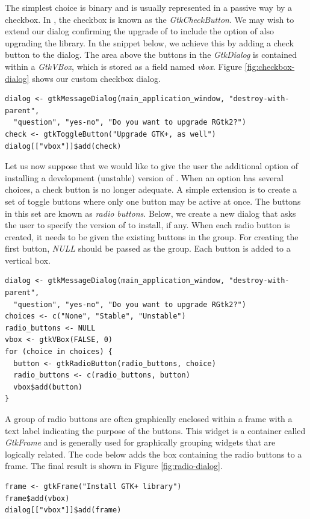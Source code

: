 \documentclass[article]{jss}
\begin{document}
The simplest choice is binary and is usually represented in a passive way 
by a checkbox. In , the checkbox is known as
the \emph{GtkCheckButton}. We may wish to extend our dialog confirming the
upgrade of  to include the option of also upgrading the  
library. In the snippet below, we achieve this by adding a check button to the dialog. 
The area above the buttons in the \emph{GtkDialog} is contained within a 
\emph{GtkVBox}, which is stored as a field named \emph{vbox}. Figure 
\ref{fig:checkbox-dialog} shows our custom checkbox dialog.
\begin{verbatim}
dialog <- gtkMessageDialog(main_application_window, "destroy-with-parent", 
  "question", "yes-no", "Do you want to upgrade RGtk2?")
check <- gtkToggleButton("Upgrade GTK+, as well")
dialog[["vbox"]]$add(check)
\end{verbatim}

Let us now suppose that we would like to give the user the additional option of
installing a development (unstable) version of .
When an option has several choices, a check button is no longer adequate. A
simple extension is to create a set of toggle buttons where only one button
may be active at once. The buttons in this set are known as \emph{radio buttons}.
Below, we create a new dialog that asks the user to specify the version of 
to install, if any. When each radio button is created, it needs to be given the existing buttons
in the group. For creating the first button, \emph{NULL} should be passed as the group.
Each button is added to a vertical box. 
\begin{verbatim}
dialog <- gtkMessageDialog(main_application_window, "destroy-with-parent", 
  "question", "yes-no", "Do you want to upgrade RGtk2?")
choices <- c("None", "Stable", "Unstable")
radio_buttons <- NULL
vbox <- gtkVBox(FALSE, 0)
for (choice in choices) {
  button <- gtkRadioButton(radio_buttons, choice)
  radio_buttons <- c(radio_buttons, button)
  vbox$add(button)
}
\end{verbatim}
A group of radio buttons are often graphically enclosed within a frame with
a text label indicating the purpose of the buttons. This widget is a container 
called \emph{GtkFrame} and is generally used for graphically grouping widgets that are
logically related. The code below adds the box containing the radio buttons
to a frame. The final result is shown in Figure \ref{fig:radio-dialog}.
\begin{verbatim}
frame <- gtkFrame("Install GTK+ library")
frame$add(vbox)
dialog[["vbox"]]$add(frame)
\end{verbatim}
\end{document}
